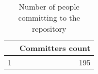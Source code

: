\begin{table}[ht]
\begin{center}
\begin{tabular}{rr}
  \hline
 & Committers count \\ 
  \hline
1 & 195 \\ 
   \hline
\end{tabular}
\caption{Number of people committing to the repository}
\end{center}
\end{table}
